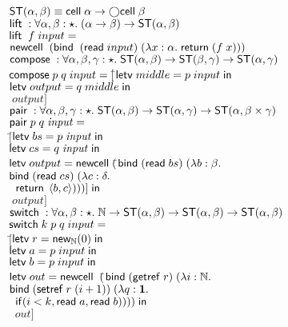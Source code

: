 \begin{figure}
\mbox{}
\begin{tabbing}
$\mathsf{ST}({\alpha}, {\beta}) \equiv \mathsf{cell}\;{\alpha} \to \bigcirc{\mathsf{cell}\;{\beta}}$ \\[1em]

$\mathsf{lift}\; : \forall \alpha,\beta:\star.\; (\alpha \to \beta) \to \mathsf{ST}({\alpha}, {\beta})$ \\
$\mathsf{lift}\;\;f\;input = $ \\
\;\; $\mathsf{newcell}\;\; (\mathsf{bind}\;\;(\mathsf{read}\; input)\; (\lambda x:\alpha.\;\mathsf{return}\; (f\;x)))$ \\[1em]

$\mathsf{compose}\; : \forall \alpha,\beta,\gamma:\star.\; \mathsf{ST}({\alpha}, {\beta}) \to \mathsf{ST}({\beta}, {\gamma}) \to \mathsf{ST}({\alpha}, {\gamma})$ \\
$\mathsf{compose}\; p\;q\;input = [$\=$\letv{middle}{p\;input}$ \\
                            \>$\letv{output}{q\;middle}$ \\ 
                            \>$\;output]$ \\[1em]

$\mathsf{pair}\; : \forall \alpha,\beta,\gamma:\star.\; \mathsf{ST}({\alpha}, {\beta}) \to \mathsf{ST}({\alpha}, {\gamma}) \to \mathsf{ST}({\alpha}, {\beta \times \gamma})$ \\
$\mathsf{pair}\; p \; q \; \mathit{input} = $ \\
\;\;$[$\=$\mathsf{letv}\;bs = p\;\mathit{input}\;\mathsf{in}\;$ \\
     \>$\mathsf{letv}\;cs = q\;\mathit{input}\;\mathsf{in}\; $ \\
     \>$\mathsf{letv}\;output = \mathsf{newcell}\; ($\=$\mathsf{bind}\; (\mathsf{read}\; bs)\; (\lambda b:\beta.$ \\
     \>                                   \>$\mathsf{bind}\; (\mathsf{read}\; cs)\; (\lambda c:\delta.$ \\
     \>                                   \>$\;\;\mathsf{return}\; \left<{b},{c}\right>)))] \;\mathsf{in}$ \\
     \>$\;output]$ \\[1em]

$\mathsf{switch}\; : \forall \alpha,\beta:\star.\; \mathbb{N} \to \mathsf{ST}({\alpha}, {\beta}) \to \mathsf{ST}({\alpha}, {\beta}) \to \mathsf{ST}({\alpha}, {\beta})$ \\
$\mathsf{switch}\; k\;p\;q\; input =  $ \\
\;\;$[$\=$\mathsf{letv}\;r = \mathsf{new}_{\mathbb{N}}(0)\;\mathsf{in}\;$ \\
    \>$\letv{a}{p\;input}$ \\
    \>$\letv{b}{p\;input}$ \\
    \>$\mathsf{letv}\; out = \mathsf{newcell}\;\; ($\=$\mathsf{bind}\; (\mathsf{getref}\; r) \;(\lambda i:\mathbb{N}.\;$ \\
    \>                                 \>$\mathsf{bind}\; (\mathsf{setref}\; r\;(i+1)) \; (\lambda q:\mathbf{1}.$ \\
    \>                                 \>$\;\;\mathsf{if}(i < k, \mathsf{read}\; a, \mathsf{read}\; b)))) \;\mathsf{in}$ \\
    \>$\;\;out]$\\[1em]


\end{tabbing}
\end{figure}
